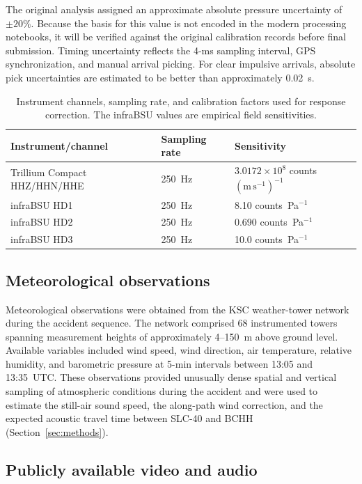 \documentclass[]{seismica}
\begin{document}
The original analysis assigned an approximate absolute pressure uncertainty of
$\pm20\%$. Because the basis for this value is not encoded in the modern
processing notebooks, it will be verified against the original calibration
records before final submission. Timing uncertainty reflects the 4-ms sampling
interval, GPS synchronization, and manual arrival picking. For clear impulsive
arrivals, absolute pick uncertainties are estimated to be better than
approximately 0.02~s.

\begin{table}
\centering
\caption{Instrument channels, sampling rate, and calibration factors used for
response correction. The infraBSU values are empirical field sensitivities.}
\label{tab:instrument_calibration}
\begin{tabular}{lll}
\hline
Instrument/channel & Sampling rate & Sensitivity \\
\hline
Trillium Compact HHZ/HHN/HHE
  & 250~Hz
  & $3.0172\times10^8$ counts $(\mathrm{m\,s^{-1}})^{-1}$ \\
infraBSU HD1
  & 250~Hz
  & 8.10 counts~Pa$^{-1}$ \\
infraBSU HD2
  & 250~Hz
  & 0.690 counts~Pa$^{-1}$ \\
infraBSU HD3
  & 250~Hz
  & 10.0 counts~Pa$^{-1}$ \\
\hline
\end{tabular}
\end{table}


\subsection{Meteorological observations}

Meteorological observations were obtained from the KSC weather-tower network
during the accident sequence. The network comprised 68 instrumented towers
spanning measurement heights of approximately 4--150~m above ground level.
Available variables included wind speed, wind direction, air temperature,
relative humidity, and barometric pressure at 5-min intervals between 13:05
and 13:35~UTC. These observations provided unusually dense spatial and vertical
sampling of atmospheric conditions during the accident and were used to
estimate the still-air sound speed, the along-path wind correction, and the
expected acoustic travel time between SLC-40 and BCHH
(Section~\ref{sec:methods}).


\subsection{Publicly available video and audio}
\end{document}
